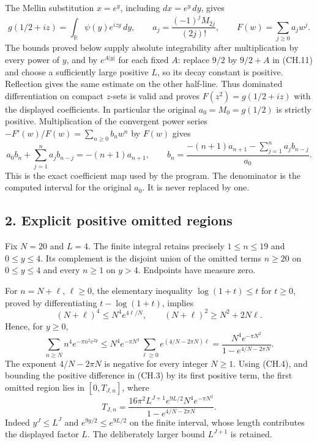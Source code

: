 The Mellin substitution \(x=e^y\), including \(dx=e^y\,dy\), gives \[
 g(1/2+iz)=\int_{\mathbb R}\psi(y)e^{izy}\,dy,\qquad
 a_j=\frac{(-1)^jM_{2j}}{(2j)!},\qquad
 F(w)=\sum_{j\ge0}a_jw^j .
\tag{CH.5}
\] The bounds proved below supply absolute integrability after multiplication by every power of \(y\), and by \(e^{A|y|}\) for each fixed \(A\): replace \(9/2\) by \(9/2+A\) in (CH.11) and choose a sufficiently large positive \(L\), so its decay constant is positive. Reflection gives the same estimate on the other half-line. Thus dominated differentiation on compact \(z\)-sets is valid and proves \(F(z^2)=g(1/2+iz)\) with the displayed coefficients. In particular the original \(a_0=M_0=g(1/2)\) is strictly positive. Multiplication of the convergent power series \(-F'(w)/F(w)=\sum_{n\ge0}b_nw^n\) by \(F(w)\) gives \[
 a_0b_n+\sum_{j=1}^n a_jb_{n-j}=-(n+1)a_{n+1},
 \qquad
 b_n=\frac{-(n+1)a_{n+1}-\sum_{j=1}^na_jb_{n-j}}{a_0}.
\tag{CH.6}
\] This is the exact coefficient map used by the program. The denominator is the computed interval for the original \(a_0\). It is never replaced by one.

\subsection{2. Explicit positive omitted regions}\label{C47stage:CH:explicit-positive-omitted-regions}

Fix \(N=20\) and \(L=4\). The finite integral retains precisely \(1\le n\le19\) and \(0\le y\le4\). Its complement is the disjoint union of the omitted terms \(n\ge20\) on \(0\le y\le4\) and every \(n\ge1\) on \(y>4\). Endpoints have measure zero.

For \(n=N+\ell\), \(\ell\ge0\), the elementary inequality \(\log(1+t)\le t\) for \(t\ge0\), proved by differentiating \(t-\log(1+t)\), implies \[
 (N+\ell)^4\le N^4e^{4\ell/N},\qquad
 (N+\ell)^2\ge N^2+2N\ell .
\tag{CH.7}
\] Hence, for \(y\ge0\), \[
 \sum_{n\ge N}n^4e^{-\pi n^2e^{2y}}
 \le
 N^4e^{-\pi N^2}
 \sum_{\ell\ge0}e^{(4/N-2\pi N)\ell}
 =
 \frac{N^4e^{-\pi N^2}}{1-e^{4/N-2\pi N}} .
\tag{CH.8}
\] The exponent \(4/N-2\pi N\) is negative for every integer \(N\ge1\). Using (CH.4), and bounding the positive difference in (CH.3) by its first positive term, the first omitted region lies in \([0,T_{J,n}]\), where \[
 T_{J,n}=
 \frac{16\pi^2L^{J+1}e^{9L/2}N^4e^{-\pi N^2}}
 {1-e^{4/N-2\pi N}} .
\tag{CH.9}
\] Indeed \(y^J\le L^J\) and \(e^{9y/2}\le e^{9L/2}\) on the finite interval, whose length contributes the displayed factor \(L\). The deliberately larger bound \(L^{J+1}\) is retained.

